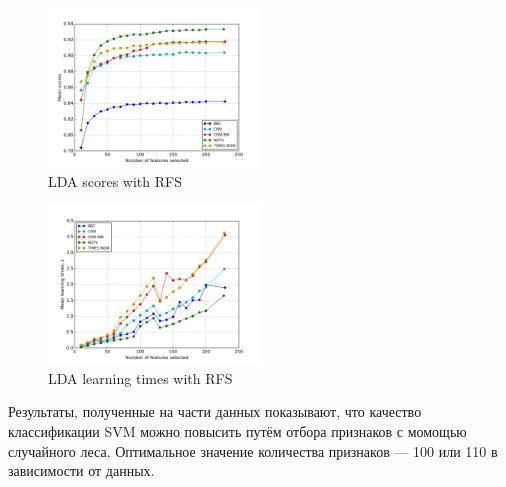 \begin{figure}[h!]
    \centering
    \includegraphics[width=0.5\textwidth]{images/RFS-LDA.png}
    \caption{LDA scores with RFS}
    \label{fig:lda_rfs_scores}
\end{figure} 
\begin{figure}[h!]
    \centering
    \includegraphics[width=0.5\textwidth]{images/RFS-LDATime.png}
    \caption{LDA learning times with RFS}
    \label{fig:lda_rfs_times}
\end{figure} 
\par
Результаты, полученные на части данных показывают, что качество классификации SVM можно повысить путём отбора признаков с момощью случайного леса. Оптимальное значение количества признаков --- 100 или 110 в зависимости от данных.

